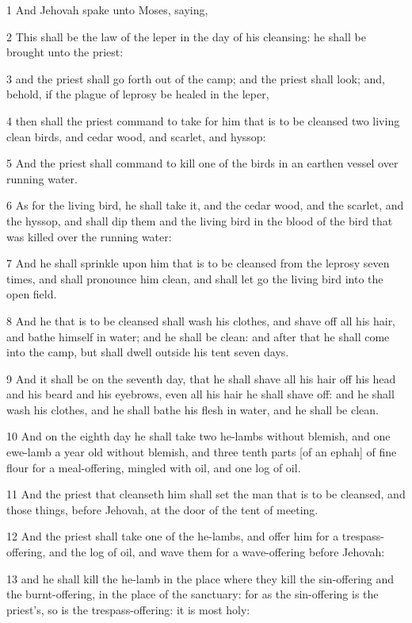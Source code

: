 \par 1 And Jehovah spake unto Moses, saying,
\par 2 This shall be the law of the leper in the day of his cleansing: he shall be brought unto the priest:
\par 3 and the priest shall go forth out of the camp; and the priest shall look; and, behold, if the plague of leprosy be healed in the leper,
\par 4 then shall the priest command to take for him that is to be cleansed two living clean birds, and cedar wood, and scarlet, and hyssop:
\par 5 And the priest shall command to kill one of the birds in an earthen vessel over running water.
\par 6 As for the living bird, he shall take it, and the cedar wood, and the scarlet, and the hyssop, and shall dip them and the living bird in the blood of the bird that was killed over the running water:
\par 7 And he shall sprinkle upon him that is to be cleansed from the leprosy seven times, and shall pronounce him clean, and shall let go the living bird into the open field.
\par 8 And he that is to be cleansed shall wash his clothes, and shave off all his hair, and bathe himself in water; and he shall be clean: and after that he shall come into the camp, but shall dwell outside his tent seven days.
\par 9 And it shall be on the seventh day, that he shall shave all his hair off his head and his beard and his eyebrows, even all his hair he shall shave off: and he shall wash his clothes, and he shall bathe his flesh in water, and he shall be clean.
\par 10 And on the eighth day he shall take two he-lambs without blemish, and one ewe-lamb a year old without blemish, and three tenth parts [of an ephah] of fine flour for a meal-offering, mingled with oil, and one log of oil.
\par 11 And the priest that cleanseth him shall set the man that is to be cleansed, and those things, before Jehovah, at the door of the tent of meeting.
\par 12 And the priest shall take one of the he-lambs, and offer him for a trespass-offering, and the log of oil, and wave them for a wave-offering before Jehovah:
\par 13 and he shall kill the he-lamb in the place where they kill the sin-offering and the burnt-offering, in the place of the sanctuary: for as the sin-offering is the priest's, so is the trespass-offering: it is most holy:
